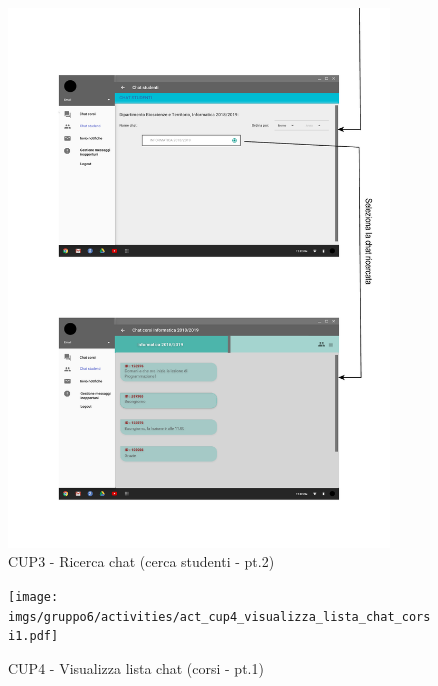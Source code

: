 \begin{figure}
	\centering
	\includegraphics[width=0.9\textwidth]{imgs/gruppo6/activities/act_cup3_ricerca_chat_studenti2.pdf}
	\caption{CUP3 - Ricerca chat (cerca studenti - pt.2)}
	\label{fig:act-cup3-8}
\end{figure}

\begin{figure}
	\centering
	\texttt{[image: imgs/gruppo6/activities/act\_cup4\_visualizza\_lista\_chat\_corsi1.pdf]}
	\caption{CUP4 - Visualizza lista chat (corsi - pt.1)}
	\label{fig:act-cup4}
\end{figure}

